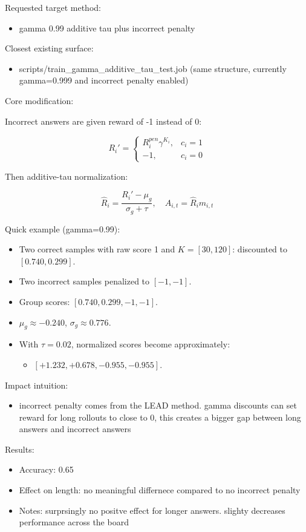 \documentclass[
]{article}
\providecommand{\tightlist}{%
  \setlength{\itemsep}{0pt}\setlength{\parskip}{0pt}}
\begin{document}
Requested target method:

\begin{itemize}
\tightlist
\item
  gamma 0.99 additive tau plus incorrect penalty
\end{itemize}

Closest existing surface:

\begin{itemize}
\tightlist
\item
  scripts/train\_gamma\_additive\_tau\_test.job (same structure,
  currently gamma=0.999 and incorrect penalty enabled)
\end{itemize}

Core modification:

Incorrect answers are given reward of -1 instead of 0:

\[
R_i' =
\begin{cases}
R_i^{pen}\gamma^{K_i}, & c_i=1 \\
-1, & c_i=0
\end{cases}
\]

Then additive-tau normalization:

\[
\hat{R}_i=\frac{R_i'-\mu_g}{\sigma_g+\tau}, \quad A_{i,t}=\hat{R}_i m_{i,t}
\]

Quick example (gamma=0.99):

\begin{itemize}
\item
  Two correct samples with raw score 1 and \(K=[30,120]\): discounted to
  \([0.740,0.299]\).
\item
  Two incorrect samples penalized to \([-1,-1]\).
\item
  Group scores: \([0.740,0.299,-1,-1]\).
\item
  \(\mu_g\approx-0.240\), \(\sigma_g\approx0.776\).
\item
  With \(\tau=0.02\), normalized scores become approximately:

  \begin{itemize}
  \tightlist
  \item
    \([+1.232, +0.678, -0.955, -0.955]\).
  \end{itemize}
\end{itemize}

Impact intuition:

\begin{itemize}
\tightlist
\item
  incorrect penalty comes from the LEAD method. gamma discounts can set
  reward for long rollouts to close to 0, this creates a bigger gap
  between long answers and incorrect answers
\end{itemize}

Results:

\begin{itemize}
\tightlist
\item
  Accuracy: 0.65
\item
  Effect on length: no meaningful differnece compared to no incorrect
  penalty
\item
  Notes: surprsingly no positve effect for longer answers. slighty
  decreases performance across the board
\end{itemize}
\end{document}
